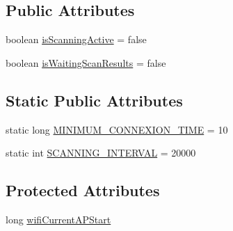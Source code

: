 \subsection*{Public Attributes}
\begin{DoxyCompactItemize}
\item 
boolean \hyperlink{classeu_1_1uloop_1_1mobilitytracker_1_1MTrackerWifiManager_a3ddfdf614c661fa2e487608063104b5d}{is\+Scanning\+Active} = false
\item 
boolean \hyperlink{classeu_1_1uloop_1_1mobilitytracker_1_1MTrackerWifiManager_aa8093ed424fc284bb785cff6900e5ea4}{is\+Waiting\+Scan\+Results} = false
\end{DoxyCompactItemize}
\subsection*{Static Public Attributes}
\begin{DoxyCompactItemize}
\item 
static long \hyperlink{classeu_1_1uloop_1_1mobilitytracker_1_1MTrackerWifiManager_a073db55ee0fb9c66520d05ae7e08d3e7}{M\+I\+N\+I\+M\+U\+M\+\_\+\+C\+O\+N\+N\+E\+X\+I\+O\+N\+\_\+\+T\+I\+M\+E} = 10
\item 
static int \hyperlink{classeu_1_1uloop_1_1mobilitytracker_1_1MTrackerWifiManager_a3955e253a5cb506942b9a803ad39efbd}{S\+C\+A\+N\+N\+I\+N\+G\+\_\+\+I\+N\+T\+E\+R\+V\+A\+L} = 20000
\end{DoxyCompactItemize}
\subsection*{Protected Attributes}
\begin{DoxyCompactItemize}
\item 
long \hyperlink{classeu_1_1uloop_1_1mobilitytracker_1_1MTrackerWifiManager_afff4c8a93bd00e9087334ec0f2cb72cd}{wifi\+Current\+A\+P\+Start}
\end{DoxyCompactItemize}
